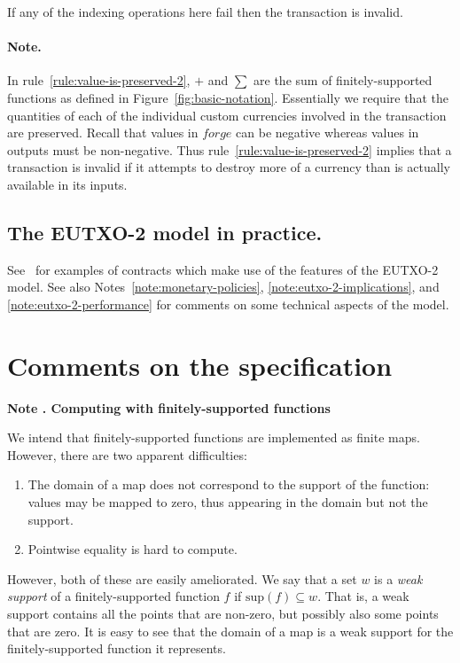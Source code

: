 \documentclass[a4paper]{article}
\newcounter{note}
\newcommand{\note}[1]{
  \bigskip
  \refstepcounter{note}
  \noindent\textbf{Note \thenote. #1}
}
\newcommand{\support}{\ensuremath{\mathrm{sup}}}
\newcommand{\mi}[1]{\ensuremath{\mathit{#1}}}
\newcommand{\forge}{\mi{forge}}
\begin{document}
\noindent If any of the indexing operations here fail then the
transaction is invalid.

\paragraph{Note.} In rule~\ref{rule:value-is-preserved-2},
$+$ and $\sum$ are the sum of finitely-supported functions as defined in
Figure~\ref{fig:basic-notation}. Essentially we require that the
quantities of each of the individual custom currencies involved in the
transaction are preserved. Recall that values in $\forge$ can
be negative whereas values in outputs must be non-negative.  Thus
rule~\ref{rule:value-is-preserved-2} implies that a
transaction is invalid if it attempts to destroy more of a currency
than is actually available in its inputs.

\subsection{The EUTXO-2 model in practice.}
See~\cite{Plutus-book} for examples of contracts which make use of the
features of the EUTXO-2 model.  See also
Notes~\ref{note:monetary-policies}, \ref{note:eutxo-2-implications},
and \ref{note:eutxo-2-performance} for comments on some technical
aspects of the model.

\appendix
\section{Comments on the specification}
\label{appendix:comments}

\note{Computing with finitely-supported functions}
\label{note:finitely-supported-functions}

We intend that finitely-supported functions are implemented as finite
maps. However, there are two apparent difficulties:
\begin{enumerate}
  \item The domain of a map does not correspond to the support of the function:
    values may be mapped to zero, thus appearing in the domain but not the support.
  \item Pointwise equality is hard to compute.
\end{enumerate}

However, both of these are easily ameliorated. We say that a set $w$ is a \textit{weak support}
of a finitely-supported function $f$ if $\support(f) \subseteq w$. That is, a
weak support contains all the points that are non-zero, but possibly also some
points that are zero. It is easy to see that the domain of a map is a weak
support for the finitely-supported function it represents.
\end{document}
